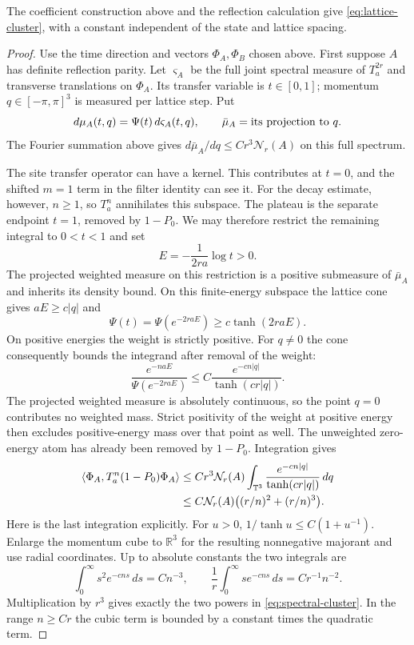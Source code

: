 \documentclass[11pt,letterpaper,reqno]{amsart}
\makeatletter
\theoremstyle{definition}
\newcommand{\ms@minorstart}{%
  \pushQED{\qed}\renewcommand{\qedsymbol}{$\blacksquare$}}
\newenvironment{proposition}[1][]{\ms@minorstart\ms@proposition[#1]}
  {\popQED\endms@proposition}
\theoremstyle{remark}
\newcommand{\R}{\mathbb R}
\makeatother
\begin{document}
\begin{proposition}[Decay to the invariant plateau]\label{prop:plateau-decay}
The coefficient construction above and the reflection calculation give \eqref{eq:lattice-cluster}, with a constant
independent of the state and lattice spacing.
\end{proposition}

\begin{proof}
Use the time direction and vectors $\Phi_A,\Phi_B$ chosen above.
First suppose $A$ has definite reflection parity. Let $\varsigma_A$
be the full joint spectral measure of $T_a^{2r}$ and transverse
translations on $\Phi_A$. Its transfer variable is $t\in[0,1]$;
momentum $q\in[-\pi,\pi]^3$ is measured per lattice step. Put
\[
 d\mu_A(t,q)=\Psi(t)\,d\varsigma_A(t,q),
 \qquad \bar\mu_A=\hbox{its projection to }q.
\]
The Fourier summation above gives
$ d\bar\mu_A/dq\le Cr^3\mathcal N_r(A)$ on this full spectrum.

The site transfer operator can have a kernel. This contributes at
$t=0$, and the shifted $m=1$ term in the filter identity can see it.
For the decay estimate, however, $n\ge1$, so $T_a^n$ annihilates
this subspace. The plateau is the separate endpoint $t=1$, removed
by $1-P_0$. We may therefore restrict the remaining integral to
$0<t<1$ and set
\[
 E=-\frac{1}{2ra}\log t>0.
\]
The projected weighted measure on this restriction is a positive
submeasure of $\bar\mu_A$ and inherits its density bound. On this
finite-energy subspace the lattice cone gives $aE\ge c|q|$ and
\[
 \Psi(t)=\Psi(e^{-2raE})\ge c\tanh(2raE).
\]
On positive energies the weight is strictly positive. For $q\ne0$
the cone consequently bounds the integrand after removal of the weight:
\[
 \frac{e^{-naE}}{\Psi(e^{-2raE})}
       \le C\frac{e^{-cn|q|}}{\tanh(cr|q|)}.
\]
The projected weighted measure is absolutely continuous, so the point
$q=0$ contributes no weighted mass. Strict positivity of the weight at
positive energy then excludes positive-energy mass over that point as well. The unweighted
zero-energy atom has already been removed by $1-P_0$.
Integration gives
\begin{align}\label{eq:spectral-cluster}
 \langle\Phi_A,T_a^n(1-P_0)\Phi_A\rangle
 &\le Cr^3\mathcal N_r(A)
       \int_{\mathbb T^3}\frac{e^{-cn|q|}}{\tanh(cr|q|)}\,dq
 \notag\\
 &\le C\mathcal N_r(A)
                 \big((r/n)^2+(r/n)^3\big).
\end{align}
Here is the last integration explicitly. For $u>0$,
$1/\tanh u\le C(1+u^{-1})$. Enlarge the momentum cube to
$\R^3$ for the resulting nonnegative majorant and use radial
coordinates. Up to absolute constants the two integrals are
\[
 \int_0^\infty s^2e^{-cns}\,ds=Cn^{-3},\qquad
 \frac1r\int_0^\infty se^{-cns}\,ds=Cr^{-1}n^{-2}.
\]
Multiplication by $r^3$ gives exactly the two powers in
\eqref{eq:spectral-cluster}. In the range $n\ge Cr$ the cubic term
is bounded by a constant times the quadratic term.


\end{proof}
\end{document}

